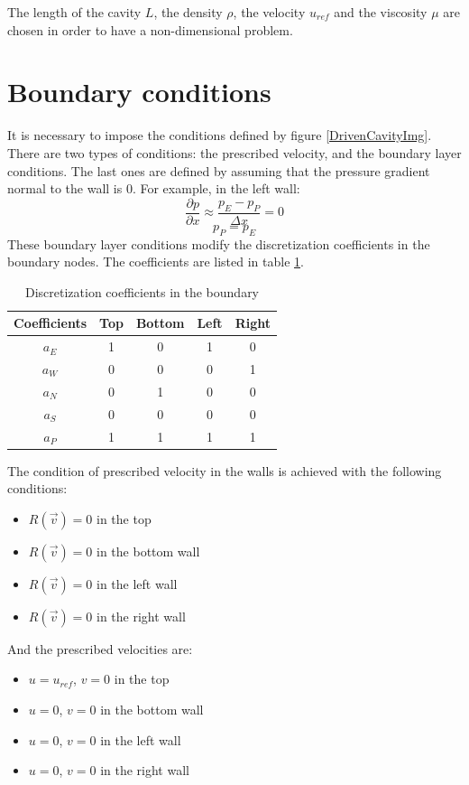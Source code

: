 The length of the cavity $L$, the density $\rho$, the velocity $u_{ref}$ and the viscosity $\mu$ are chosen in order to have a non-dimensional problem. 

\section{Boundary conditions}
It is necessary to impose the conditions defined by figure \ref{DrivenCavityImg}. There are two types of conditions: the prescribed velocity, and the boundary layer conditions. The last ones are defined by assuming that the pressure gradient normal to the wall is 0. For example, in the left wall:
\begin{equation}
	\frac{\partial p}{\partial x}\approx\frac{p_{E}-p_{P}}{\Delta x}=0
\end{equation}
\begin{equation}
p_{P}=p_{E}
\end{equation}
These boundary layer conditions modify the discretization coefficients in the boundary nodes. The coefficients are listed in table \ref{DCBoundaryCoefficients}.
\begin{table}[h]
	\centering
	\begin{tabular}{ |c|c|c|c|c| }
		\hline
		Coefficients & Top & Bottom & Left & Right \\ \hline
		$a_{E}$ & 1 & 0 & 1 & 0 \\ \hline
		$a_{W}$ & 0 & 0 & 0 & 1 \\ \hline
		$a_{N}$ & 0 & 1 & 0 & 0 \\ \hline
		$a_{S}$ & 0 & 0 & 0 & 0 \\ \hline
		$a_{P}$ & 1 & 1 & 1 & 1 \\ \hline
	\end{tabular}
\caption{Discretization coefficients in the boundary}
\label{DCBoundaryCoefficients}
\end{table}

The condition of prescribed velocity in the walls is achieved with the following conditions:
\begin{itemize}
	\item $R\left(\vec{v}\right)=0$ in the top
	\item $R\left(\vec{v}\right)=0$ in the bottom wall
	\item $R\left(\vec{v}\right)=0$ in the left wall
	\item $R\left(\vec{v}\right)=0$ in the right wall
\end{itemize}
And the prescribed velocities are:
\begin{itemize}
	\item $u=u_{ref}$, $v=0$ in the top
	\item $u=0$, $v=0$ in the bottom wall
	\item $u=0$, $v=0$ in the left wall
	\item $u=0$, $v=0$ in the right wall
\end{itemize}

